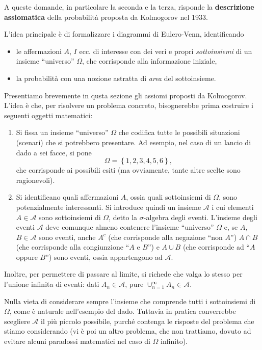 \documentclass[
  italian,
  letterpaper,
]{book}
\providecommand{\tightlist}{%
  \setlength{\itemsep}{0pt}\setlength{\parskip}{0pt}}
\newcommand{\cur}[1]{\left\{ #1 \right\}}
\theoremstyle{definition}
\theoremstyle{remark}
\begin{document}
A queste domande, in particolare la seconda e la terza, risponde la
\textbf{descrizione assiomatica} della probabilità proposta da
Kolmogorov nel 1933.

L'idea principale è di formalizzare i diagrammi di Eulero-Venn,
identificando

\begin{itemize}
\tightlist
\item
  le affermazioni \(A\), \(I\) ecc. di interesse con dei veri e propri
  \emph{sottoinsiemi} di un insieme ``universo'' \(\Omega\), che
  corrisponde alla informazione iniziale,
\item
  la probabilità con una nozione astratta di \emph{area} del
  sottoinsieme.
\end{itemize}

Presentiamo brevemente in qusta sezione gli assiomi proposti da
Kolmogorov. L'idea è che, per risolvere un problema concreto,
bisognerebbe prima costruire i seguenti oggetti matematici:

\begin{enumerate}
\def\labelenumi{\alph{enumi})}
\item
  Si fissa un insieme ``universo'' \(\Omega\) che codifica tutte le
  possibili situazioni (scenari) che si potrebbero presentare. Ad
  esempio, nel caso di un lancio di dado a sei facce, si pone
  \[\Omega  = \cur{1,2,3,4,5,6},\] che corrisponde ai possibili esiti
  (ma ovviamente, tante altre scelte sono ragionevoli).
\item
  Si identificano quali affermazioni \(A\), ossia quali sottoinsiemi di
  \(\Omega\), sono potenzialmente interessanti. Si introduce quindi un
  insieme \(\mathcal{A}\) i cui elementi \(A \in \mathcal{A}\) sono
  sottoinsiemi di \(\Omega\), detto la \(\sigma\)-algebra degli eventi.
  L'insieme degli eventi \(\mathcal{A}\) deve comunque almeno contenere
  l'insieme ``universo'' \(\Omega\) e, se \(A\), \(B \in \mathcal{A}\)
  sono eventi, anche \(A^c\) (che corrisponde alla negazione ``non
  \(A\)'') \(A \cap B\) (che corrisponde alla congiunzione ``\(A\) e
  \(B\)'') e \(A \cup B\) (che corrisponde ad ``\(A\) oppure \(B\)'')
  sono eventi, ossia appartengono ad \(\mathcal{A}\).
\end{enumerate}

Inoltre, per permettere di passare al limite, si richede che valga lo
stesso per l'unione infinita di eventi: dati \(A_n \in \mathcal{A}\),
pure \(\cup_{n=1}^\infty A_n \in \mathcal{A}\).

Nulla vieta di considerare sempre l'insieme che comprende tutti i
sottoinsiemi di \(\Omega\), come è naturale nell'esempio del dado.
Tuttavia in pratica converrebbe scegliere \(\mathcal{A}\) il più piccolo
possibile, purché contenga le risposte del problema che stiamo
considerando (vi è poi un altro problema, che non trattiamo, dovuto ad
evitare alcuni paradossi matematici nel caso di \(\Omega\) infinito).
\end{document}
